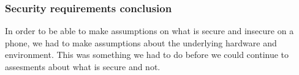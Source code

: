 
\subsubsection{Security requirements conclusion}
In order to be able to make assumptions on what is secure and insecure on a phone, we had to make assumptions about the underlying hardware and environment. This was something we had to do before we could continue to assesments about what is secure and not. %
